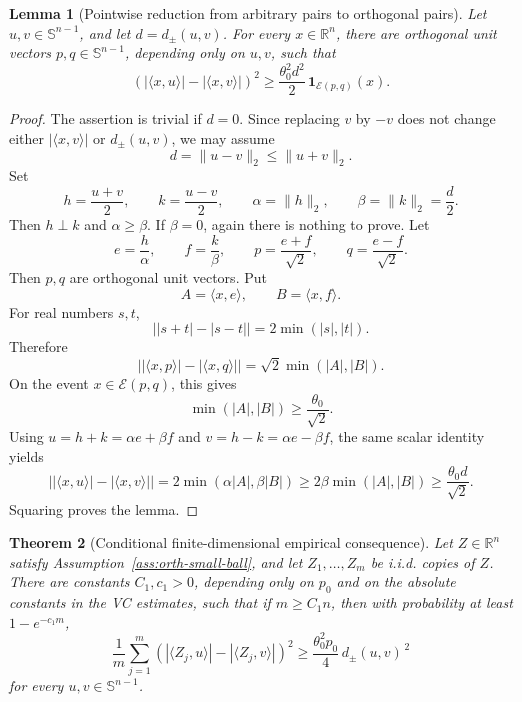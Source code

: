 \documentclass[11pt]{amsart}
\numberwithin{equation}{section}
\newtheorem{theorem}{Theorem}[section]
\newtheorem{lemma}[theorem]{Lemma}
\theoremstyle{definition}
\theoremstyle{remark}
\newcommand{\R}{\mathbb R}
\newcommand{\Sph}{\mathbb S}
\newcommand{\norm}[1]{\lVert #1 \rVert}
\newcommand{\distpm}[2]{d_{\pm}(#1,#2)}
\begin{document}
\begin{lemma}[Pointwise reduction from arbitrary pairs to orthogonal pairs]
\label{lem:pointwise-reduction}
Let \(u,v\in\Sph^{n-1}\), and let \(d=\distpm{u}{v}\).  For every
\(x\in\R^n\), there are orthogonal unit vectors \(p,q\in\Sph^{n-1}\), depending
only on \(u,v\), such that
\[
\left(
  |\langle x,u\rangle|-|\langle x,v\rangle|
\right)^2
\ge
\frac{\theta_0^2 d^2}{2}\,
\mathbf 1_{\mathcal E(p,q)}(x).
\]
\end{lemma}

\begin{proof}
The assertion is trivial if \(d=0\).  Since replacing \(v\) by \(-v\) does not
change either \(|\langle x,v\rangle|\) or \(\distpm{u}{v}\), we may assume
\[
        d=\norm{u-v}_2\le\norm{u+v}_2 .
\]
Set
\[
        h=\frac{u+v}{2},\qquad k=\frac{u-v}{2},
\qquad
        \alpha=\norm{h}_2,\qquad \beta=\norm{k}_2=\frac d2 .
\]
Then \(h\perp k\) and \(\alpha\ge\beta\).  If \(\beta=0\), again there is
nothing to prove.  Let
\[
        e=\frac{h}{\alpha},\qquad f=\frac{k}{\beta},
\qquad
        p=\frac{e+f}{\sqrt2},\qquad q=\frac{e-f}{\sqrt2}.
\]
Then \(p,q\) are orthogonal unit vectors.  Put
\[
        A=\langle x,e\rangle,\qquad B=\langle x,f\rangle.
\]
For real numbers \(s,t\),
\[
        \bigl||s+t|-|s-t|\bigr|=2\min(|s|,|t|).
\]
Therefore
\[
\bigl||\langle x,p\rangle|-|\langle x,q\rangle|\bigr|
=\sqrt2\min(|A|,|B|).
\]
On the event \(x\in\mathcal E(p,q)\), this gives
\[
        \min(|A|,|B|)\ge\frac{\theta_0}{\sqrt2}.
\]
Using \(u=h+k=\alpha e+\beta f\) and \(v=h-k=\alpha e-\beta f\), the same
scalar identity yields
\[
\bigl||\langle x,u\rangle|-|\langle x,v\rangle|\bigr|
=2\min(\alpha|A|,\beta|B|)
\ge 2\beta\min(|A|,|B|)
\ge \frac{\theta_0 d}{\sqrt2}.
\]
Squaring proves the lemma.
\end{proof}

\begin{theorem}[Conditional finite-dimensional empirical consequence]
\label{thm:conditional-vc}
Let \(Z\in\R^n\) satisfy Assumption~\ref{ass:orth-small-ball}, and let
\(Z_1,\ldots,Z_m\) be i.i.d. copies of \(Z\).  There are constants
\(C_1,c_1>0\), depending only on \(p_0\) and on the absolute constants in the
VC estimates, such that if \(m\ge C_1n\), then with probability at least
\(1-e^{-c_1m}\),
\[
\frac1m\sum_{j=1}^m
\left(
  |\langle Z_j,u\rangle|-|\langle Z_j,v\rangle|
\right)^2
\ge
\frac{\theta_0^2p_0}{4}\,\distpm{u}{v}^{\,2}
\]
for every \(u,v\in\Sph^{n-1}\).
\end{theorem}
\end{document}
